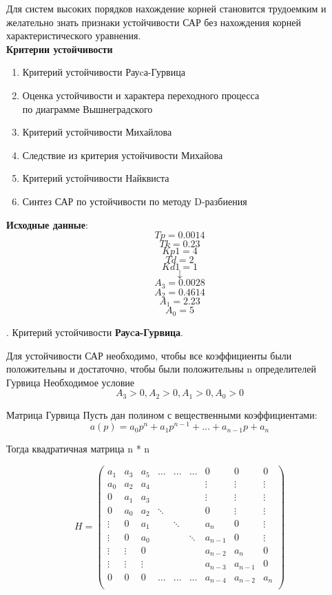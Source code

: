 \documentclass[12pt, a4paper]{report}
\def\Tp{0.0014}
\def\Tk{0.23}
\def\Kp1{4}
\def\Td{2}
\def\Kd1{1}
\def\AAAA{0.0028}
\def\AAA{0.4614}
\def\AA{2.23}
\def\A{5}
\begin{document}
Для систем высоких порядков нахождение корней становится трудоемким и желательно знать признаки устойчивости
САР без нахождения корней характеристического уравнения.\\

\textbf{Критерии устойчивости}
\begin{enumerate}
 \item Критерий устойчивости Рауcа-Гурвица
 \item Оценка устойчивости и характера переходного процесса\\по диаграмме Вышнеградского
 \item Критерий устойчивости Михайлова
 \item Следствие из критерия устойчивости Михайова
 \item Критерий устойчивости Найквиста
 \item Синтез САР по устойчивости по методу D-разбиения
\end{enumerate}

\textbf{Исходные данные}:
$$ Tp = \Tp $$
$$ Tk = \Tk $$
$$ Kp1 = \Kp1 $$
$$ Td = \Td $$
$$ Kd1 = \Kd1 $$
$$ \downarrow $$
$$ A_{3} = \AAAA $$
$$ A_{2} = \AAA $$
$$ A_{1} = \AA $$
$$ A_{0} = \A $$

. Критерий устойчивости \textbf{Рауcа-Гурвица}.

Для устойчивости САР необходимо, чтобы все коэффициенты были положительны и достаточно, чтобы были положительны n определителей Гурвица
Необходимое условие
$$ A_{3} > 0, A_{2} > 0, A_{1} > 0, A_{0} > 0 $$

Матрица Гурвица
Пусть дан полином с вещественными коэффициентами: $$ a(p) = a_{0}p^n + a_{1}p^{n-1} + \ldots + a_{n-1}p + a_{n}$$

Тогда квадратичная матрица n * n

$$
    H = \begin{pmatrix}
        a_{1}  &a_{3}  &a_{5}  &\dots  &\dots  &\dots  &0      &0      &0\\
        a_{0}  &a_{2}  &a_{4}  &       &       &       &\vdots  &\vdots  &\vdots \\
        0      &a_{1}  &a_{3}  &       &       &       &\vdots  &\vdots  &\vdots \\
        0      &a_{0}  &a_{2}  &\ddots &       &       &0       &\vdots  &\vdots \\
        \vdots &0      &a_{1}  &       &\ddots &       &a_{n}   &0       &\vdots \\
        \vdots &0      &a_{0}  &       &       &\ddots &a_{n-1} &0       &\vdots \\
        \vdots &\vdots &0      &       &       &       &a_{n-2} &a_{n}   &0      \\
        \vdots &\vdots &\vdots &       &       &       &a_{n-3} &a_{n-1} &0      \\
        0      &0      &0      &\dots  &\dots  &\dots  &a_{n-4} &a_{n-2} &a_{n}  \\
        \end{pmatrix}
$$
\end{document}
